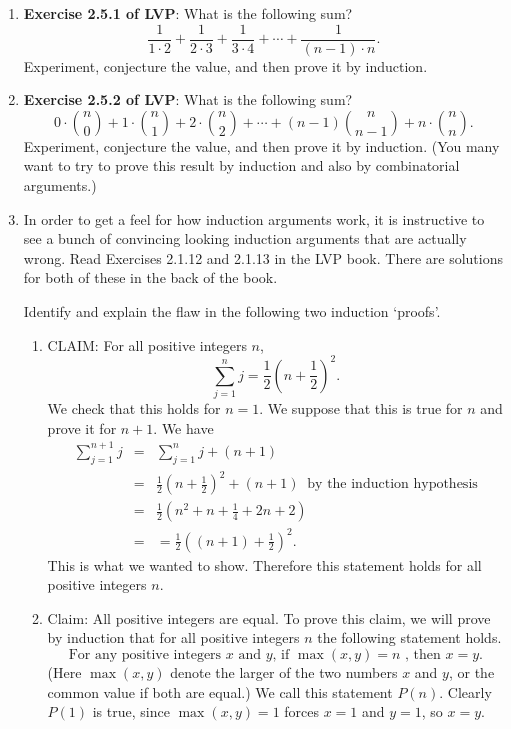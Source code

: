 \documentclass[11pt]{article}
\begin{document}
\begin{enumerate}
\item {\bf Exercise 2.5.1 of LVP}: What is the following sum?
\[
\frac{1}{1\cdot 2}+\frac{1}{2\cdot 3} +\frac{1}{3\cdot 4} + \cdots + \frac{1}{(n-1)\cdot n}.
\]
Experiment, conjecture the value, and then prove it by induction.

\item {\bf Exercise 2.5.2 of LVP}: What is the following sum?
\[
0\cdot \binom{n}{0} + 1 \cdot \binom{n}{1} + 2\cdot \binom{n}{2} + \cdots + (n-1) \binom{n}{n-1} + n \cdot \binom{n}{n}.
\]
Experiment, conjecture the value, and then prove it by induction.  (You many want to try to prove this result by induction and also by combinatorial arguments.)

\item In order to get a feel for how induction arguments work, it is instructive to see a bunch of convincing looking induction arguments that are actually wrong.  Read Exercises 2.1.12 and 2.1.13 in the LVP book.  There are solutions for both of these in the back of the book.  


Identify and explain the flaw in the following two induction `proofs'.
\begin{enumerate}
\item CLAIM: For all positive integers $n$,
\[ 
\sum_{j=1}^n j = \frac{1}{2} \left(n+\frac{1}{2}\right)^2.
\]
We check that this holds for $n=1$.  We suppose that this is true for $n$ and prove it for $n+1$.  We have
\begin{eqnarray*} 
\sum_{j=1}^{n+1} j & = &  \sum_{j=1}^n j + (n+1) \\
& = & \frac{1}{2} \left(n+\frac{1}{2}\right)^2 + (n+1)\ \text{ by the induction hypothesis} \\
& = & \frac{1}{2}\left(n^2 + n +\frac{1}{4} + 2n+2\right) \\
& = & = \frac{1}{2} \left( (n+1) + \frac{1}{2} \right)^2.
\end{eqnarray*}
This is what we wanted to show.  Therefore this statement holds for all positive integers $n$.

\item Claim: All positive integers are equal.  To prove this claim, we will prove by induction that for all positive integers $n$ the following statement holds.
\[
\text{For any positive integers } x \text{ and } y \text{, if } \max(x,y) = n \text{ , then } x=y.
\]
(Here $\max(x,y)$ denote the larger of the two numbers $x$ and $y$, or the common value if both are equal.)  We call this statement $P(n)$.  Clearly $P(1)$ is true, since $\max(x,y) = 1$ forces $x=1$ and $y=1$, so $x=y$.


\end{enumerate}
\end{enumerate}
\end{document}
